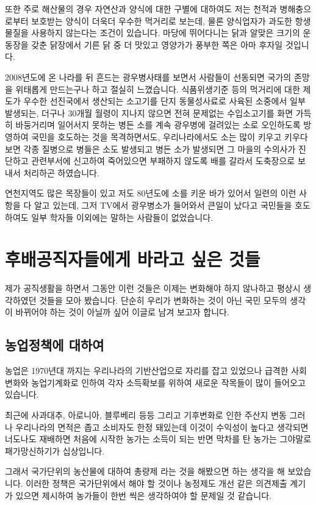 \documentclass[chapter,book,openany,twoside]{oblivoir}
\begin{document}
또한 주로 해산물의 경우 자연산과 양식에 대한 구별에 대하여도 저는 천적과 병해충으로부터 보호받는 양식이 더욱더 우수한 먹거리로 보는데, 물론 양식업자가 과도한 항생물질을 사용하지 않는다는 조건이 있습니다. 마당에 뛰어다니는 닭과 알맞은 크기의 운동장을 갖춘 닭장에서 기른 닭 중 더 맛있고 영양가가 풍부한 쪽은 아마 후자일 것입니다.

2008년도에 온 나라를 뒤 흔드는 광우병사태를 보면서 사람들이 선동되면 국가의 존망을 위태롭게 만드는구나 하고 절실히 느꼈습니다. 식품위생기준 등의 먹거리에 대한 제도가 우수한 선진국에서 생산되는 소고기를 단지 동물성사료로 사육된 소중에서 일부 발생되는, 더구나 30개월 월령이 지나지 않으면 전혀 문제없는 수입소고기를 화면 가득히 바둥거리며 일어서지 못하는 병든 소를 계속 광우병에 걸려있는 소로 오인하도록 방영하여 국민을 호도하는 것을 목격하면서도, 우리나라에서도 소는 많이 키우고 키우다 보면 각종 질병으로 병들은 소도 발생되고 병든 소가 발생되면 그 마을의 수의사가 진단하고 관련부서에 신고하여 죽어있으면 부패하지 않도록 배를 갈라서 도축장으로 보내서 처리하곤 하였습니다.

연천지역도 많은 목장들이 있고 저도 80년도에 소를 키운 바가 있어서 일련의 이런 사항을 다 알고 있는데, 그저 TV에서 광우병소가 들어와서 큰일이 났다고 국민들을 호도하여도 일부 학자들 이외에는 말하는 사람들이 없었습니다.

\section{후배공직자들에게 바라고 싶은 것들}

제가 공직생활을 하면서 그동안 이런 것들은 이제는 변화해야 하지 않나하고 평상시 생각하였던 것들을 모아 봤습니다. 단순히 우리가 변화하는 것이 아닌 국민 모두의 생각이 바뀌어야 하는 것이 아닐까 싶어 이글로 남겨 보고자 합니다.

\subsection{농업정책에 대하여}

농업은 1970년대 까지는 우리나라의 기반산업으로 자리를 잡고 있었으나 급격한 사회변화와 농업기계화로 인하여 각자 소득확보를 위하여 새로운 작목들이 많이 들어오고 있습니다.

최근에 사과대추, 아로니아, 블루베리 등등 그리고 기후변화로 인한 주산지 변동 그러나 우리나라의 면적은 좁고 소비자도 한정 돼있는데 이것이 수익성이 높다고 생각되면 너도나도 재배하면 처음에 시작한 농가는 소득이 되는 반면 막차를 탄 농가는 그야말로 패가망신하기가 십상입니다. 

그래서 국가단위의 농산물에 대하여 총량제 라는 것을 해봤으면 하는 생각을 해 보았습니다. 이러한 정책은 국가단위에서 해야 할 것이나 농정제도 개선 같은 의견제출 계기가 있으면 제시하여 농가들이 한번 씩은 생각하여야 할 문제일 것 같습니다. 
\end{document}
